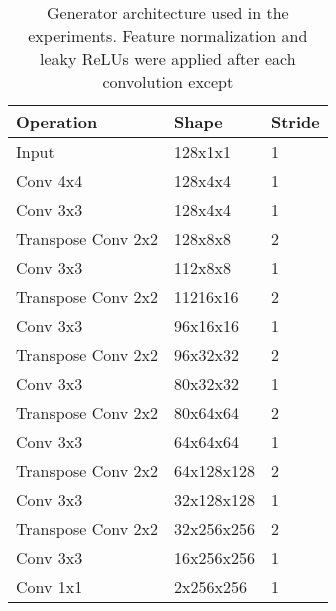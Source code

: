 \begin{table}[t]
    \centering
    \caption{Generator architecture used in the experiments. Feature normalization and leaky ReLUs were applied after each convolution except}
    \label{tab:generator}
    \begin{tabular}{lll}
        \hline
        Operation          & Shape     & Stride \\ \hline
        Input              & 128x1x1   & 1      \\
        Conv 4x4           & 128x4x4   & 1      \\
        Conv 3x3           & 128x4x4   & 1      \\ \hline
        Transpose Conv 2x2 & 128x8x8   & 2      \\
        Conv 3x3           & 112x8x8   & 1      \\ \hline
        Transpose Conv 2x2 & 11216x16   & 2      \\
        Conv 3x3           & 96x16x16   & 1      \\ \hline
        Transpose Conv 2x2 & 96x32x32   & 2      \\
        Conv 3x3           & 80x32x32   & 1      \\ \hline
        Transpose Conv 2x2 & 80x64x64   & 2      \\
        Conv 3x3           & 64x64x64   & 1      \\ \hline
        Transpose Conv 2x2 & 64x128x128   & 2      \\
        Conv 3x3           & 32x128x128   & 1      \\ \hline
        Transpose Conv 2x2 & 32x256x256   & 2      \\
        Conv 3x3           & 16x256x256   & 1      \\ \hline
        Conv 1x1           & 2x256x256 & 1     
    \end{tabular}
\end{table}

